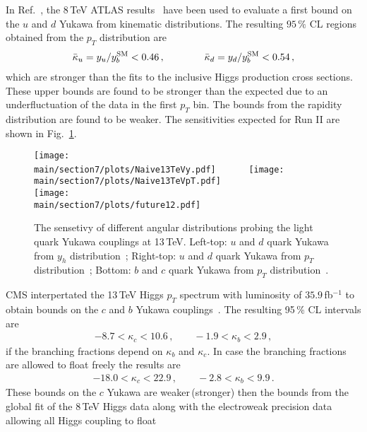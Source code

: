 \documentclass[../report.tex]{subfiles}
\providecommand{\main}{..}
\begin{document}
In Ref.~\cite{Soreq:2016rae}, the 8\,TeV ATLAS results~\cite{Aad:2015lha} have been used to evaluate a first bound on the $u$ and $d$ Yukawa from kinematic distributions. The resulting $95\,\%$ CL regions obtained from the  $p_T$ distribution are
%
\begin{align}
	\bar{\kappa}_u = y_u/y^{\rm SM}_b < 0.46 \, , \qquad\qquad
	\bar{\kappa}_d = y_d/y^{\rm SM}_b< 0.54 \, ,
\end{align}
%
which are stronger than the fits to the inclusive Higgs production cross sections. 
These upper bounds are found to be stronger than the expected due to an underfluctuation of the data in the first $p_T$ bin. 
The bounds from the  rapidity distribution are found to be weaker. 
The sensitivities expected for Run II  are shown in Fig.~\ref{fig:HiggsDistFuture}. 
\begin{figure}[t]
\begin{center}
\texttt{[image: \\main/section7/plots/Naive13TeVy.pdf]}~~~~~~
\texttt{[image: \\main/section7/plots/Naive13TeVpT.pdf]}\\
\texttt{[image: \\main/section7/plots/future12.pdf]}
\caption{The sensetivy of  different angular distributions probing the light quark Yukawa couplings at 13\,TeV.  
Left-top: $u$ and $d$ quark Yukawa from $y_h$ distribution~\cite{Soreq:2016rae};
Right-top: $u$ and $d$ quark Yukawa from $p_T$ distribution~\cite{Soreq:2016rae}; 
Bottom: $b$ and $c$ quark Yukawa from $p_T$ distribution~\cite{Bishara:2016jga}. 
}
\label{fig:HiggsDistFuture}
\end{center}
\end{figure}

CMS interpertated the 13\,TeV Higgs $p_T$ spectrum with luminosity of $35.9\,$fb$^{-1}$ to obtain bounds on the $c$ and $b$ Yukawa couplings~\cite{CMS:2018hhg}. The resulting 95\,\% CL intervals are
%
\begin{align}
    -8.7 < \kappa_c <10.6 \, ,  \qquad
    -1.9 < \kappa_b < 2.9 \, ,
\end{align}
if the branching fractions  depend on $\kappa_b$ and $\kappa_c$. In case the branching fractions are allowed to float freely the results are
\begin{align}
    -18.0 < \kappa_c < 22.9 \, , \qquad
    -2.8 < \kappa_b < 9.9 \, .
\end{align}
%
These bounds on the $c$ Yukawa are weaker\,(stronger) then the bounds from the global fit of the 8\,TeV Higgs data along with the electroweak precision data allowing all Higgs coupling to float~\cite{Perez:2015aoa}  
\end{document}

